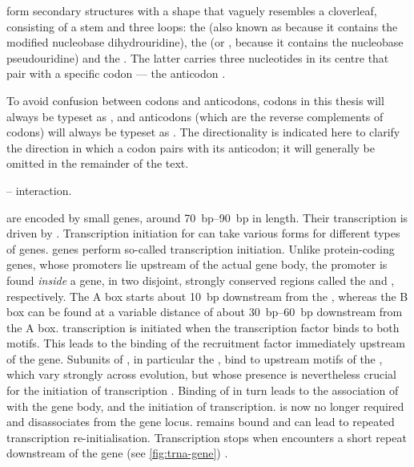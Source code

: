 \trna[s]
form secondary structures with a shape that vaguely resembles a
cloverleaf, consisting of a stem and three loops: the  (also
known as  because it contains the modified nucleobase
dihydrouridine), the  (or , because it contains
the nucleobase pseudouridine) and the . The latter
carries three nucleotides in its centre that pair with a specific codon --- the
anticodon \citep{Kim:1973,Suddath:1974,Robertus:1974,Rich:1978,Schimmel:1979}.

To avoid confusion between codons and anticodons, codons in this thesis will
always be typeset as , and anticodons (which are the
reverse complements of codons) will always be typeset as
. The directionality is indicated here to clarify the
direction in which a codon pairs with its anticodon; it will generally be
omitted in the remainder of the text.

    {-- interaction.}
    {}

\trna[s] are encoded by small genes, around \SIrange{70}{90}{bp} in length.
Their transcription is driven by . Transcription initiation for  can
take various forms for different types of genes. \trna genes perform so-called
  transcription initiation. Unlike protein-coding
genes, whose promoters lie upstream of the actual gene body, the promoter is
found \emph{inside} a \trna gene, in two disjoint, strongly conserved regions
called the  and , respectively. The A box starts
about \SI{10}{bp} downstream from the \tss, whereas the B box can be found at a
variable distance of about \SIrange{30}{60}{bp} downstream from the A box. \trna
transcription is initiated when the transcription factor \tfiiic binds to both
motifs. This leads to the binding of the  recruitment factor \tfiiib
immediately upstream of the \trna gene. Subunits of \tfiiib, in particular the
\tbp, bind to upstream motifs of the \trna, which vary strongly across
evolution, but whose presence is nevertheless crucial for the initiation of
transcription \citep{Palida:1993,White:1992}. Binding of \tfiiib in turn leads
to the association of  with the gene body, and the initiation of
transcription. \tfiiic is now no longer required and disassociates from the gene
locus. \tfiiib remains bound and can lead to repeated transcription
re-initialisation. Transcription stops when  encounters a short \nT repeat
downstream of the \trna gene (see \cref{fig:trna-gene})
\citep{White:1998,Dieci:2007}.

